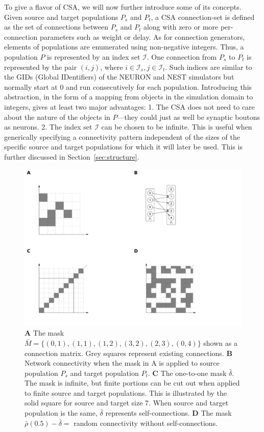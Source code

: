 \documentclass{frontiersSCNS} %
\newcommand{\INLINEFIGS}{} %
\begin{document}
To give a flavor of CSA, we will now further introduce some of its
concepts.  Given source and target populations $P_s$ and $P_t$, a CSA
connection-set is defined as the set of connections between $P_s$ and
$P_t$ along with zero or more per-connection parameters such as weight
or delay. As for connection generators, elements of populations are
enumerated using non-negative integers. Thus, a population $P$ is
represented by an index set $\mathcal{I}$. One connection from $P_s$
to $P_t$ is represented by the pair $(i, j)$, where $i \in
\mathcal{I}_s, j \in \mathcal{I}_t$.  Such indices are similar to the
GIDs (Global IDentifiers) of the NEURON and NEST simulators but
normally start at 0 and run consecutively for each population.
Introducing this abstraction, in the form of a mapping from objects in
the simulation domain to integers, gives at least two major
advantages: 1. The CSA does not need to care about the nature of the
objects in $P$---they could just as well be synaptic boutons as
neurons.  2. The index set $\mathcal{I}$ can be chosen to be
infinite. This is useful when generically specifying a connectivity
pattern independent of the sizes of the specific source and target
populations for which it will later be used. This is further discussed
in Section~\ref{sec:structure}.

\ifdefined\INLINEFIGS
\begin{figure}[ht]
\centering
\includegraphics[scale=.7]{figures/csa-pane.pdf}
\caption{
  \textbf{A} The mask $\overline{M} =
  \{(0,1), (1,1), (1,2), (3,2), (2,3), (0,4)\}$ shown as a connection
  matrix. Grey squares represent existing connections.
  \textbf{B} Network connectivity when the mask in A is applied to
  source population $P_s$ and target population
  $P_t$.
  \textbf{C} The one-to-one mask $\bar{\delta}$. The mask is infinite,
  but finite portions can be cut out when applied to finite source and
  target populations. This is illustrated by the solid square for
  source and target size 7. When source and target population is the
  same, $\bar{\delta}$ represents self-connections.
  \textbf{D} The mask $\bar{\rho}(0.5) - \bar{\delta} =$ random
  connectivity without self-connections.
}\label{fig:csa} 
\end{figure}
\fi
\end{document}
